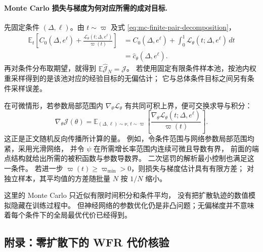 \documentclass[UTF8,a4paper,11pt,fontset=fandol]{ctexart}
\begin{document}
\paragraph{Monte Carlo 损失与梯度为何对应所需的成对目标.}
先固定条件 $(\Delta,\ell)$。由 $t\sim\varpi$ 及式
\eqref{eq:mc-finite-pair-decomposition}，
\begin{equation}
\begin{aligned}
\mathbb E_t\left[
C_0(\Delta,e^\ell)
+\frac{\mathcal L_\theta(t;\Delta,e^\ell)}{\varpi(t)}\right]
&=C_0(\Delta,e^\ell)+\int_0^1\mathcal L_\theta(t;\Delta,e^\ell)\,dt\\
&=\widehat c_\theta(\Delta,e^\ell).
\end{aligned}
\end{equation}
再对条件分布取期望，就得到
$\mathbb E\widehat{\mathcal J}_N=\mathcal J$。
若使用固定有限条件样本池，按池内权重采样得到的是该池对应的经验目标的无偏估计；
它与总体条件目标之间另有条件采样误差。

在可微情形，若参数局部范围内
$\nabla_\theta\mathcal L_\theta$ 有共同可积上界，便可交换求导与积分：
\begin{equation}
\nabla_\theta\mathcal J(\theta)
=\mathbb E_{(\Delta,\ell)\sim\nu,\,t\sim\varpi}
\left[\frac{\nabla_\theta\mathcal L_\theta(t;\Delta,e^\ell)}{\varpi(t)}\right].
\end{equation}
这正是正文随机反向传播所计算的量。
例如，令条件范围与网络参数局部范围均紧，采用光滑网络，
并令 $\psi$ 在所需增长率范围内连续可微且导数有界，
前面的端点结构就给出所需的被积函数与参数导数界。
二次惩罚的解析最小控制也满足这一条件。
若进一步 $\varpi(t)\ge\varpi_{\min}>0$，则损失与梯度估计具有有限方差；
对独立样本，其平均值的方差随批量 $N$ 按 $1/N$ 缩小。

这里的 Monte Carlo 只近似有限时间积分和条件平均，
没有把扩散轨迹的数值模拟隐藏在训练过程中。
但神经网络的参数优化仍是非凸问题；无偏梯度并不意味着每个条件下的全局最优代价已经得到。

\clearpage
\setcounter{equation}{0}
\renewcommand{\theequation}{F.\arabic{equation}}
\renewcommand{\theHequation}{F.\arabic{equation}}
\subsection*{附录：零扩散下的 WFR 代价核验}
\end{document}
